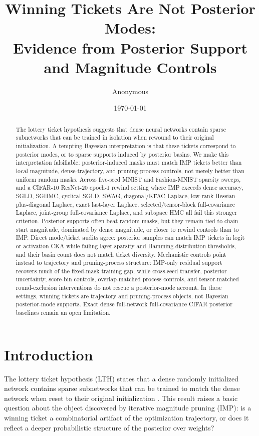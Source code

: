 \documentclass{article}
\title{Winning Tickets Are Not Posterior Modes:\\
Evidence from Posterior Support and Magnitude Controls}
\author{Anonymous}
\date{\today}
\begin{document}
\maketitle

\begin{abstract}
The lottery ticket hypothesis suggests that dense neural networks contain sparse
subnetworks that can be trained in isolation when rewound to their original
initialization. A tempting Bayesian interpretation is that these tickets
correspond to posterior modes, or to sparse supports induced by posterior
basins. We make this interpretation falsifiable: posterior-induced masks must
match IMP tickets better than local magnitude, dense-trajectory, and
pruning-process controls, not merely better than uniform random masks. Across
five-seed MNIST and Fashion-MNIST sparsity sweeps, and a CIFAR-10 ResNet-20
epoch-1 rewind setting where IMP exceeds dense accuracy, SGLD, SGHMC, cyclical
SGLD, SWAG, diagonal/KFAC Laplace, low-rank Hessian-plus-diagonal Laplace,
exact last-layer Laplace, selected/tensor-block full-covariance Laplace,
joint-group full-covariance Laplace, and subspace HMC all fail this stronger
criterion. Posterior supports often beat random masks, but they remain tied to
chain-start magnitude, dominated by dense magnitude, or closer to rewind
controls than to IMP. Direct mode/ticket audits agree: posterior samples can
match IMP tickets in logit or activation CKA while failing layer-sparsity and
Hamming-distribution thresholds, and their basin count does not match ticket
diversity. Mechanistic controls point instead to trajectory and pruning-process
structure: IMP-only residual support recovers much of the fixed-mask training
gap, while cross-seed transfer, posterior uncertainty, score-bin controls,
overlap-matched process controls, and tensor-matched round-exclusion
interventions do not rescue a posterior-mode account. In these settings,
winning tickets are trajectory and pruning-process objects, not Bayesian
posterior-mode supports. Exact dense full-network full-covariance CIFAR
posterior baselines remain an open limitation.
\end{abstract}

\section{Introduction}

The lottery ticket hypothesis (LTH) states that a dense randomly initialized
network contains sparse subnetworks that can be trained to match the dense
network when reset to their original initialization \citep{frankle2019lottery}.
This result raises a basic question about the object discovered by iterative
magnitude pruning (IMP): is a winning ticket a combinatorial artifact of the
optimization trajectory, or does it reflect a deeper probabilistic structure of
the posterior over weights?
\end{document}
